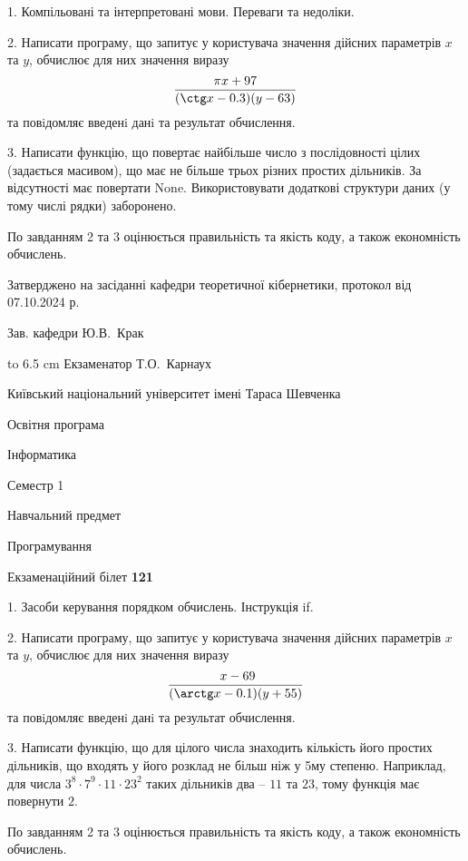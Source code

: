 \documentclass[12pt, ukrainian]{article}
\begin{document}
{%
1. Компільовані та інтерпретовані мови. Переваги та недоліки.%
\par
2. Написати програму, що запитує у користувача значення дійсних параметрів $x$ та $y$, обчислює для них значення виразу 
$$\frac{\pi x + 97}{(\ctg x - 0.3) (y - 63)}$$ 
та повiдомляє введенi данi та результат обчислення.

\par
3. Написати функцію, що повертає найбільше число з послідовності цілих (задається масивом), що має не більше трьох різних простих дільників. За відсутності має повертати None. Використовувати додаткові структури даних (у тому числі рядки) заборонено.

По завданням 2 та 3 оцінюється правильність та якість коду, а також економність обчислень.

}
{\smallskip\smallskip \begin {scriptsize} Затверджено на засіданні кафедри теоретичної кібернетики, протокол   від   07.10.2024 р.\par\smallskip\smallskip\smallskip\smallskip
{\parbox {6.5 cm} {Зав. кафедри \dotfill Ю.В.~Крак}}\hspace {0.7cm} {\hbox to 6.5 cm { Екзаменатор \dotfill Т.О.~Карнаух}} \end{scriptsize}}
\newpage
{{\begin {scriptsize}\par
{ \center  Київський національний університет імені Тараса Шевченка \par}
{\parbox {5 cm}{Освітня програма \hfill}{\parbox {7 cm}{Інформатика\hfill}}\parbox {6 cm}{\hfill Семестр 1}}\par
{\parbox {5 cm} {Навчальний предмет \hfill}\parbox {7 cm}{Програмування \hfill}\parbox {6cm}{\hfill}\par}\vspace{-15pt} \end{scriptsize}}{\center Екзаменаційний білет \No \textbf { 121 }\par}}
{%
1. Засоби керування порядком обчислень. Інструкція if.%
\par
2. Написати програму, що запитує у користувача значення дійсних параметрів $x$ та $y$, обчислює для них значення виразу 
$$\frac{\ x - 69}{(\arctg x - 0.1) (y + 55)}$$ 
та повiдомляє введенi данi та результат обчислення.

\par
3. Написати функцію, що для цілого числа знаходить кількість його простих дільників, що входять у його розклад не більш ніж у 5му степеню. Наприклад, для числа $3^8{\cdot}7^9{\cdot}11{\cdot}23^{2}$ таких дільників два – $11$ та $23$, тому функція має повернути $2$.

По завданням 2 та 3 оцінюється правильність та якість коду, а також економність обчислень.

}
\end{document}
